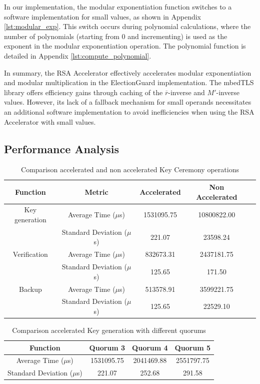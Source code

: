 In our implementation, the modular exponentiation function switches to a software implementation for small values, as shown in Appendix \ref{lst:modular_exp}. This switch occurs during polynomial calculations, where the number of polynomials (starting from 0 and incrementing) is used as the exponent in the modular exponentiation operation. The polynomial function is detailed in Appendix \ref{lst:compute_polynomial}.

In summary, the RSA Accelerator effectively accelerates modular exponentiation and modular multiplication in the ElectionGuard implementation. The mbedTLS library offers efficiency gains through caching of the \( \overline{r} \)-inverse and \( M' \)-inverse values. However, its lack of a fallback mechanism for small operands necessitates an additional software implementation to avoid inefficiencies when using the RSA Accelerator with small values.

\subsection{Performance Analysis}
\begin{table}[h!]
    \centering
    \begin{tabular}{|c|c|c|c|c|}
        \hline
        \textbf{Function} & \textbf{Metric} & \textbf{Accelerated} & \textbf{Non Accelerated} \\
        \hline
        Key generation & Average Time (\(\mu\)s) & 1531095.75 & 10800822.00\\
        \hline
         & Standard Deviation (\(\mu\)s) & 221.07 & 23598.24 \\
        \hline
        Verification & Average Time (\(\mu\)s) & 832673.31 &  2437181.75\\
        \hline
         & Standard Deviation (\(\mu\)s) & 125.65 &  171.50\\
        \hline
        Backup & Average Time (\(\mu\)s) & 513578.91 & 3599221.75 \\
        \hline
        & Standard Deviation (\(\mu\)s) & 125.65 & 22529.10 \\
        \hline
    \end{tabular}
    \caption{Comparison accelerated and non accelerated Key Ceremony operations}
    \label{tab:perfromance}
\end{table}
\begin{table}[h!]
    \centering
    \begin{tabular}{|c|c|c|c|}
        \hline
        \textbf{Function} & \textbf{Quorum 3} & \textbf{Quorum 4} & \textbf{Quorum 5} \\
        \hline
        Average Time (\(\mu\)s) & 1531095.75 & 2041469.88 & 2551797.75\\
        \hline
        Standard Deviation (\(\mu\)s) & 221.07 & 252.68 & 291.58 \\
        \hline
    \end{tabular}
    \caption{Comparison accelerated Key generation with different quorums}
    \label{tab:perfromance-quorum}
\end{table}

